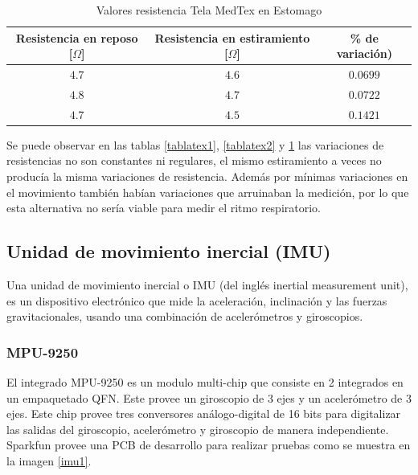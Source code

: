 \begin{table}[H]
	\centering
	\begin{tabular}{| c | c | c |}
		\hline
		\multicolumn{1}{|c|}{\textbf{Resistencia en reposo [$\Omega$]}}&
		\multicolumn{1}{c|}{\textbf{Resistencia en estiramiento [$\Omega$]}}&
		\multicolumn{1}{|c|}{\textbf{\% de variación)}}\\ \hline
		$4.7$  & $4.6$  & $0.0699$  \\ \hline
		$4.8$  & $4.7$ & $0.0722$ \\ \hline
		$4.7$ & $4.5$  & $0.1421$  \\ \hline
	\end{tabular}
	\caption{Valores resistencia Tela MedTex en Estomago}
	\label{tablatex3}
\end{table}

Se puede observar en las tablas \ref{tablatex1}, \ref{tablatex2} y \ref{tablatex3} las variaciones de resistencias no son constantes ni regulares, el mismo estiramiento a veces no producía la misma variaciones de resistencia. Además por mínimas variaciones en el movimiento también habían variaciones que arruinaban la medición, por lo que esta alternativa no sería viable para medir el ritmo respiratorio.

\subsection{Unidad de movimiento inercial (IMU)}
Una unidad de movimiento inercial o IMU (del inglés inertial measurement unit), es un dispositivo electrónico que mide la aceleración, inclinación y las fuerzas gravitacionales, usando una combinación de acelerómetros y giroscopios.
\subsubsection{MPU-9250}
El integrado MPU-9250 es un modulo multi-chip que consiste en 2 integrados en un empaquetado QFN. Este provee un giroscopio de 3 ejes y un acelerómetro de 3 ejes.
Este chip provee tres conversores análogo-digital de 16 bits para digitalizar las salidas del giroscopio, acelerómetro y giroscopio de manera independiente.\\
Sparkfun provee una PCB de desarrollo para realizar pruebas como se muestra en la imagen \ref{imu1}.

